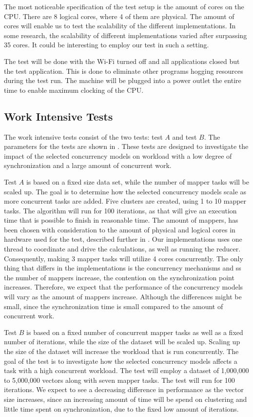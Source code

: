 The most noticeable specification of the test setup is the amount of cores on the \ac{CPU}. There are 8 logical cores, where 4 of them are physical. The amount of cores will enable us to test the scalability of the different implementations. In some research\cite{harris2003language}, the scalability of different implementations varied after surpassing 35 cores. It could be interesting to employ our test in such a setting.

The test will be done with the Wi-Fi turned off and all applications closed but the test application. This is done to eliminate other programs hogging resources during the test run. The machine will be plugged into a power outlet the entire time to enable maximum clocking of the \ac{CPU}.

\subsection{Work Intensive Tests}
The work intensive tests consist of the two tests: test $A$ and test $B$. The parameters for the tests are shown in . These tests are designed to investigate the impact of the selected concurrency models on workload with a low degree of synchronization and a large amount of concurrent work.

Test $A$ is based on a fixed size data set, while the number of mapper tasks will be scaled up. The goal is to determine how the selected concurrency models scale as more concurrent tasks are added. Five clusters are created, using 1 to 10 mapper tasks. The algorithm will run for 100 iterations, as that will give an execution time that is possible to finish in reasonable time. The amount of mappers, has been chosen with consideration to the amount of physical and logical cores in hardware used for the test, described further in . Our implementations uses one thread to coordinate and drive the calculations, as well as running the reducer. Consequently, making 3 mapper tasks will utilize 4 cores concurrently. The only thing that differs in the implementations is the concurrency mechanisms and ss the number of mappers increase, the contention on the synchronization point increases. Therefore, we expect that the performance of the concurrency models will vary as the amount of mappers increase. Although the differences might be small, since the synchronization time is small compared to the amount of concurrent work. 

Test $B$ is based on a fixed number of concurrent mapper tasks as well as a fixed number of iterations, while the size of the dataset will be scaled up. Scaling up the size of the dataset will increase the workload that is run concurrently. The goal of the test is to investigate how the selected concurrency models affects a task with a high concurrent workload. The test will employ a dataset of 1,000,000 to 5,000,000 vectors along with seven mapper tasks. The test will run for 100 iterations. We expect to see a decreasing difference in performance as the vector size increases, since an increasing amount of time will be spend on clustering and little time spent on synchronization, due to the fixed low amount of iterations.

